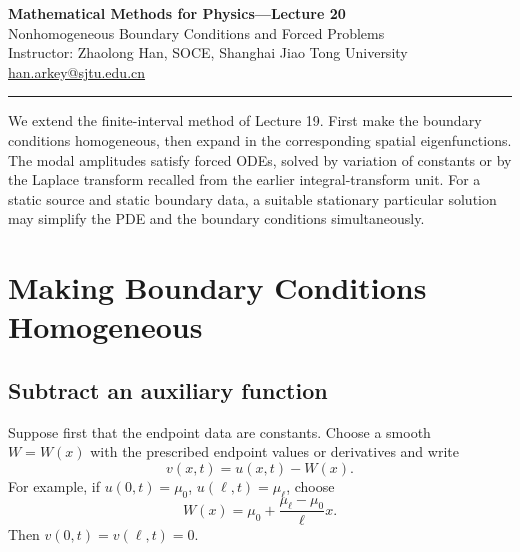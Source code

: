 \documentclass[11pt,a4paper]{article}
\begin{document}
\begin{center}
  {\Large\bfseries Mathematical Methods for Physics---Lecture 20}\\[6pt]
  {\large Nonhomogeneous Boundary Conditions and Forced Problems}\\[10pt]
  Instructor: Zhaolong Han, SOCE, Shanghai Jiao Tong University\\
  \href{mailto:han.arkey@sjtu.edu.cn}{han.arkey@sjtu.edu.cn}
\end{center}
\hrule\medskip
We extend the finite-interval method of Lecture 19. First make the boundary
conditions homogeneous, then expand in the corresponding spatial eigenfunctions.
The modal amplitudes satisfy forced ODEs, solved by variation of constants or by
the Laplace transform recalled from the earlier integral-transform unit.
For a static source and static boundary data, a suitable stationary particular
solution may simplify the PDE and the boundary conditions simultaneously.

\section{Making Boundary Conditions Homogeneous}
\subsection{Subtract an auxiliary function}
Suppose first that the endpoint data are constants. Choose a smooth $W=W(x)$
with the prescribed endpoint values or derivatives and write
\begin{equation}
 v(x,t)=u(x,t)-W(x).
\end{equation}
For example, if $u(0,t)=\mu_0$, $u(\ell,t)=\mu_\ell$, choose
\begin{equation}\label{eq:linearlifting}
 W(x)=\mu_0+\frac{\mu_\ell-\mu_0}{\ell}x.
\end{equation}
Then $v(0,t)=v(\ell,t)=0$.
\end{document}
